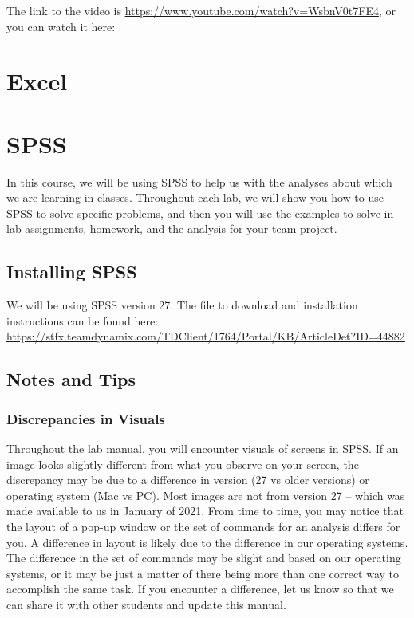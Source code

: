 \documentclass[
]{book}
\begin{document}
The link to the video is \url{https://www.youtube.com/watch?v=WsbnV0t7FE4}, or you can watch it here:

\hypertarget{excel}{%
\section{Excel}\label{excel}}

\hypertarget{spss}{%
\section{SPSS}\label{spss}}

In this course, we will be using SPSS to help us with the analyses about which we are learning in classes. Throughout each lab, we will show you how to use SPSS to solve specific problems, and then you will use the examples to solve in-lab assignments, homework, and the analysis for your team project.

\hypertarget{installing-spss}{%
\subsection{Installing SPSS}\label{installing-spss}}

We will be using SPSS version 27. The file to download and installation instructions can be found here: \url{https://stfx.teamdynamix.com/TDClient/1764/Portal/KB/ArticleDet?ID=44882}

\hypertarget{notes-and-tips}{%
\subsection{Notes and Tips}\label{notes-and-tips}}

\hypertarget{discrepancies-in-visuals}{%
\subsubsection{Discrepancies in Visuals}\label{discrepancies-in-visuals}}

Throughout the lab manual, you will encounter visuals of screens in SPSS. If an image looks slightly different from what you observe on your screen, the discrepancy may be due to a difference in version (27 vs older versions) or operating system (Mac vs PC). Most images are not from version 27 -- which was made available to us in January of 2021. From time to time, you may notice that the layout of a pop-up window or the set of commands for an analysis differs for you. A difference in layout is likely due to the difference in our operating systems. The difference in the set of commands may be slight and based on our operating systems, or it may be just a matter of there being more than one correct way to accomplish the same task. If you encounter a difference, let us know so that we can share it with other students and update this manual.
\end{document}

